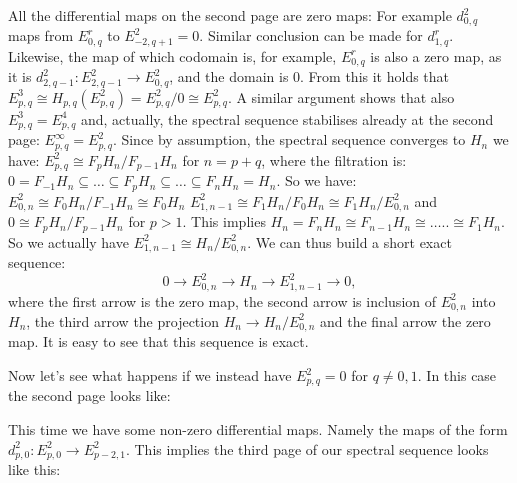\documentclass{article}
\begin{document}
All the differential maps on the second page are zero maps: For example $d_{0,q}^2$ maps from $E_{0,q}^r$ to $E_{-2,q+1}^2 = 0$. Similar conclusion can be made for $d_{1,q}^r$. Likewise, the map of which codomain is, for example, $E_{0,q}^r$ is also a zero map, as it is $d_{2,q-1}^2 : E_{2,q-1}^2 \to E_{0,q}^2$, and the domain is $0$. From this it holds that $E^3_{p,q} \cong H_{p,q}(E^2_{p,q}) = E^2_{p,q}/0 \cong E^2_{p,q}$. A similar argument shows that also $E^3_{p,q} = E^4_{p,q}$ and, actually, the spectral sequence stabilises already at the second page: $E^\infty_{p,q} = E^2_{p,q}$.
Since by assumption, the spectral sequence converges to $H_n$ we have:
$E^2_{p,q} \cong F_p H_n / F_{p-1} H_n$ for $n=p+q$,
where the filtration is:
$0 = F_{-1} H_n \subseteq \dots \subseteq F_p H_n \subseteq \dots \subseteq F_n H_n = H_n$.
So we have: $E^2_{0,n} \cong F_0 H_n / F_{-1} H_n \cong F_0 H_n$
$E^2_{1,n-1} \cong F_1 H_n / F_0 H_n \cong F_1 H_n / E^2_{0,n}$ and $0 \cong F_p H_n / F_{p-1} H_n$ for $p>1$.
This implies $H_n = F_n H_n \cong F_{n-1} H_n \cong \dots .. \cong F_1 H_n$.
So we actually have $E^2_{1,n-1} \cong H_n / E_{0,n}^2$. We can thus build a short exact sequence:
\begin{equation*}
0 \to E_{0,n}^2 \to H_n \to E_{1,n-1}^2 \to 0,
\end{equation*}
where the first arrow is the zero map, the second arrow is inclusion of $E_{0,n}^2$ into $H_n$, the third arrow the projection $H_n \to H_n/E_{0,n}^2$ and the final arrow the zero map. It is easy to see that this sequence is exact.

Now let's see what happens if we instead have $E^2_{p,q} = 0$ for $q \neq 0,1$. In this case the second page looks like:

\begin{center}\end{center}

This time we have some non-zero differential maps. Namely the maps of the form $d^2_{p,0}: E^2_{p,0} \to E^2_{p-2,1}$.
This implies the third page of our spectral sequence looks like this:
\end{document}
